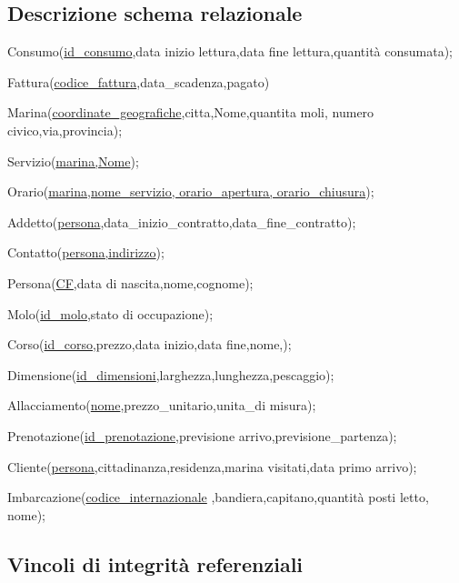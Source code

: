 \subsection{Descrizione schema relazionale}

Consumo(\underline{id\_consumo},data inizio lettura,data fine lettura,quantità consumata);

Fattura(\underline{codice\_fattura},data\_scadenza,pagato) 

Marina(\underline{coordinate\_geografiche},citta,Nome,quantita moli, numero civico,via,provincia);

Servizio(\underline{marina,Nome});

Orario(\underline{marina,nome\_servizio, orario\_apertura, orario\_chiusura});

Addetto(\underline{persona},data\_inizio\_contratto,data\_fine\_contratto);

Contatto(\underline{persona,indirizzo});

Persona(\underline{CF},data di nascita,nome,cognome);

Molo(\underline{id\_molo},stato di occupazione);

Corso(\underline{id\_corso},prezzo,data inizio,data fine,nome,);

Dimensione(\underline{id\_dimensioni},larghezza,lunghezza,pescaggio);

Allacciamento(\underline{nome},prezzo\_unitario,unita\_di misura);

Prenotazione(\underline{id\_prenotazione},previsione arrivo,previsione\_partenza);

Cliente(\underline{persona},cittadinanza,residenza,marina visitati,data primo arrivo);

Imbarcazione(\underline{codice\_internazionale} ,bandiera,capitano,quantità posti letto, nome);


\subsection{Vincoli di integrità referenziali}

